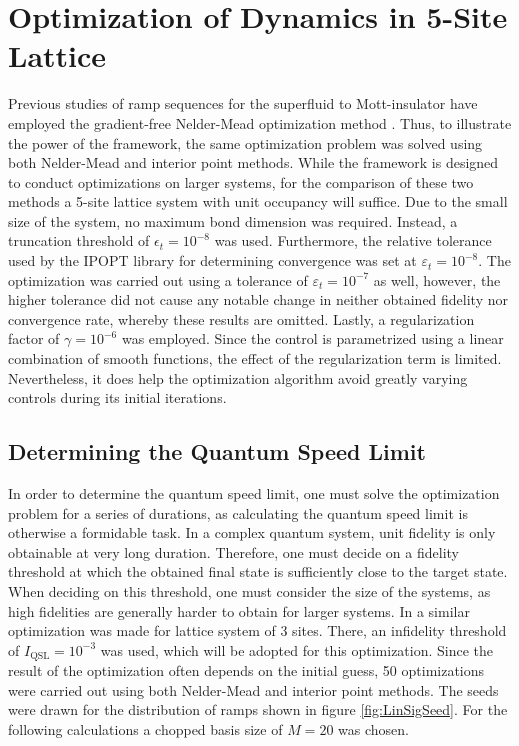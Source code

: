\section{Optimization of Dynamics in 5-Site Lattice} \label{sec:5partOptimization}
Previous studies of ramp sequences for the superfluid to Mott-insulator have employed the gradient-free Nelder-Mead optimization method \cite{Doria2011,FrankBloch}. Thus, to illustrate the power of the framework, the same optimization problem was solved using both Nelder-Mead and interior point methods. While the framework is designed to conduct optimizations on larger systems, for the comparison of these two methods a 5-site lattice system with unit occupancy will suffice. Due to the small size of the system, no maximum bond dimension was required. Instead, a truncation threshold of $\epsilon_t = 10^{-8}$ was used. Furthermore, the relative tolerance used by the IPOPT library for determining convergence was set at $\varepsilon_t = 10^{-8}$. The optimization was carried out using a tolerance of $\varepsilon_t = 10^{-7}$ as well, however, the higher tolerance did not cause any notable change in neither obtained fidelity nor convergence rate, whereby these results are omitted.
Lastly, a regularization factor of $\gamma = 10^{-6}$ was employed. Since the control is parametrized using a linear combination of smooth functions, the effect of the regularization term is limited. Nevertheless, it does help the optimization algorithm avoid greatly varying controls during its initial iterations.
 

\subsection{Determining the Quantum Speed Limit}
In order to determine the quantum speed limit, one must solve the optimization problem for a series of durations, as calculating the quantum speed limit is otherwise a formidable task. In a complex quantum system, unit fidelity is only obtainable at very long duration. Therefore, one must decide on a fidelity threshold at which the obtained final state is sufficiently close to the target state. When deciding on this threshold, one must consider the size of the systems, as high fidelities are generally harder to obtain for larger systems. In \cite{MajaJulie} a similar optimization was made for lattice system of 3 sites. There, an infidelity threshold of $I_{\mathrm{QSL}} = 10^{-3}$ was used, which will be adopted for this optimization.
Since the result of the optimization often depends on the initial guess, 50 optimizations were carried out using both Nelder-Mead and interior point methods. The seeds were drawn for the distribution of ramps shown in figure \ref{fig:LinSigSeed}. For the following calculations a chopped basis size of $M = 20$ was chosen.

